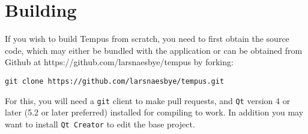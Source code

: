\section{Building}

If you wish to build Tempus from scratch, you need to first obtain the source code, which may either be bundled with the application or can be obtained from Github at https://github.com/larsnaesbye/tempus by forking:

\texttt{git clone https://github.com/larsnaesbye/tempus.git}

For this, you will need a \texttt{git} client to make pull requests, and \texttt{Qt} version 4 or later (5.2 or later preferred) installed for compiling to work. In addition you may want to install \texttt{Qt Creator} to edit the base project.

